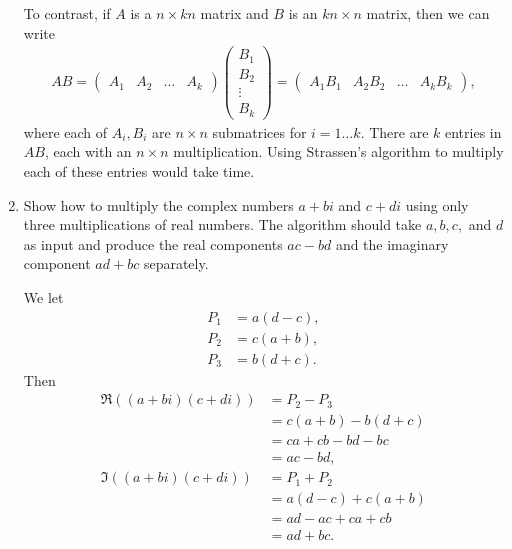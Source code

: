 \documentclass[Chapter04]{subfiles}
\begin{document}
\begin{enumerate}
\begin{answer}
			To contrast, if $A$ is a $n \times kn$ matrix and $B$ is an $kn \times n$ matrix, then we can write
			\begin{align*}
				AB =
				\begin{pmatrix}
					A_1 & A_2 & \dots & A_k
				\end{pmatrix}
				\begin{pmatrix}
					B_1\\
					B_2\\
					\vdots\\
					B_k
				\end{pmatrix}
				=
				\begin{pmatrix}
					A_1B_1 & A_2B_2 & \dots & A_kB_k
				\end{pmatrix},
			\end{align*}
			where each of $A_i,B_i$ are $n \times n$ submatrices for $i = 1 \dots k$. There are $k$ entries in $AB$, each with an $n \times n$ multiplication. Using Strassen's algorithm to multiply each of these entries would take  time.
		\end{answer}

		\item Show how to multiply the complex numbers $a + bi$ and $c + di$ using only three multiplications of real numbers. The algorithm should take $a, b, c,$ and $d$ as input and produce the real components $ac-bd$ and the imaginary component $ad+bc$ separately.
		\begin{answer}
			We let
			\begin{align*}
				P_1 &= a(d - c),\\
				P_2 &= c(a + b),\\
				P_3 &= b(d + c).
			\end{align*}
			Then
			\begin{align*}
				\Re((a + bi)(c + di)) &= P_2 - P_3\\
					&= c(a + b) - b(d + c)\\
					&= ca + cb - bd -bc\\
					&= ac - bd,\\
				\Im((a + bi)(c + di)) &= P_1 + P_2\\
					&= a(d - c) + c(a + b)\\
					&= ad - ac + ca + cb\\
					&= ad + bc.
			\end{align*}
		\end{answer}

	\end{enumerate}
\end{document}
